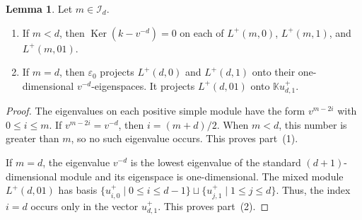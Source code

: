 \documentclass[12pt]{amsart}
\numberwithin{equation}{section}
\theoremstyle{definition}
\newtheorem{lemma}[theorem]{Lemma}
\theoremstyle{definition}
\newcommand{\kk}{\mathbb K}
\newcommand{\eps}{\varepsilon}
\newcommand{\Ker}{\operatorname{Ker}}
\newcommand{\Iset}{\mathcal I}
\begin{document}
\begin{lemma}\label{lem:lowspace}
Let $m\in\Iset_d$.
\begin{enumerate}
\item[(1)] If $m<d$, then $\Ker(k-v^{-d})=0$ on each of $L^+(m,0)$, $L^+(m,1)$, and $L^+(m,01)$.
\item[(2)] If $m=d$, then $\eps_0$ projects $L^+(d,0)$ and $L^+(d,1)$ onto their one-dimensional $v^{-d}$-eigenspaces. It projects $L^+(d,01)$ onto $\kk u^+_{d,1}$.
\end{enumerate}
\end{lemma}
\begin{proof}
The eigenvalues on each positive simple module have the form $v^{m-2i}$ with $0\le i\le m$. If $v^{m-2i}=v^{-d}$, then $i=(m+d)/2$. When $m<d$, this number is greater than $m$, so no such eigenvalue occurs. This proves part~(1).

If $m=d$, the eigenvalue $v^{-d}$ is the lowest eigenvalue of the standard $(d+1)$-dimensional module and its eigenspace is one-dimensional. 
The mixed module $L^+(d,01)$ has basis $\{u^+_{i,0}\mid0\le i\le d-1\}
\sqcup
\{u^+_{j,1}\mid1\le j\le d\}$. 
Thus, the index $i=d$ occurs only in the vector $u^+_{d,1}$. This proves part~(2).
\end{proof}
\end{document}
